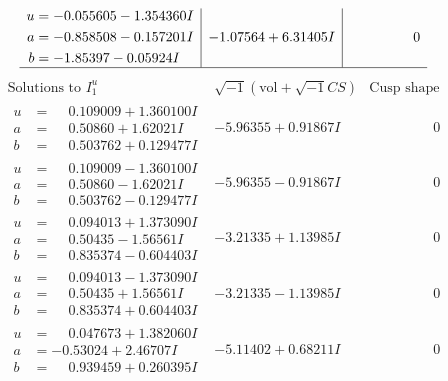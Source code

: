 \documentclass[1p]{elsarticle_modified}
\theoremstyle{definition}
\newcommand{\I}{\sqrt{-1}}
\begin{document}
$$\begin{array}{c|c|c}
\begin{aligned}
u &= -0.055605 - 1.354360 I \\
a &= -0.858508 - 0.157201 I \\
b &= -1.85397 - 0.05924 I\end{aligned}
 & -1.07564 + 6.31405 I & \phantom{-0.000000 } 0\\
 \hline 
 \end{array}$$\newpage$$\begin{array}{c|c|c}  
\text{Solutions to }I^u_{1}& \I (\text{vol} + \sqrt{-1}CS) & \text{Cusp shape}\\
 \hline 
\begin{aligned}
u &= \phantom{-}0.109009 + 1.360100 I \\
a &= \phantom{-}0.50860 + 1.62021 I \\
b &= \phantom{-}0.503762 + 0.129477 I\end{aligned}
 & -5.96355 + 0.91867 I & \phantom{-0.000000 } 0 \\ \hline\begin{aligned}
u &= \phantom{-}0.109009 - 1.360100 I \\
a &= \phantom{-}0.50860 - 1.62021 I \\
b &= \phantom{-}0.503762 - 0.129477 I\end{aligned}
 & -5.96355 - 0.91867 I & \phantom{-0.000000 } 0 \\ \hline\begin{aligned}
u &= \phantom{-}0.094013 + 1.373090 I \\
a &= \phantom{-}0.50435 - 1.56561 I \\
b &= \phantom{-}0.835374 - 0.604403 I\end{aligned}
 & -3.21335 + 1.13985 I & \phantom{-0.000000 } 0 \\ \hline\begin{aligned}
u &= \phantom{-}0.094013 - 1.373090 I \\
a &= \phantom{-}0.50435 + 1.56561 I \\
b &= \phantom{-}0.835374 + 0.604403 I\end{aligned}
 & -3.21335 - 1.13985 I & \phantom{-0.000000 } 0 \\ \hline\begin{aligned}
u &= \phantom{-}0.047673 + 1.382060 I \\
a &= -0.53024 + 2.46707 I \\
b &= \phantom{-}0.939459 + 0.260395 I\end{aligned}
 & -5.11402 + 0.68211 I & \phantom{-0.000000 } 0 \\ \hline\begin{aligned}

\end{aligned}
\end{array}$$
\end{document}
